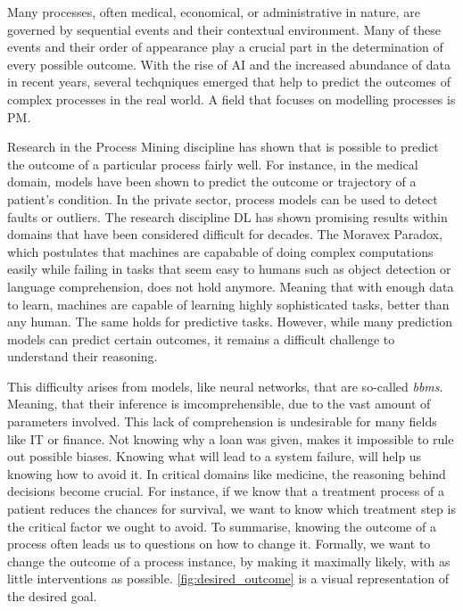 \documentclass[./../../paper.tex]{subfiles}
\begin{document}
Many processes, often medical, economical, or administrative in nature, are governed by sequential events and their contextual environment. Many of these events and their order of appearance play a crucial part in the determination of every possible outcome\autocite{vanderaalst_ProcessMiningManifesto_2012}. With the rise of AI and the increased abundance of data in recent years, several techqniques emerged that help to predict the outcomes of complex processes in the real world. A field that focuses on modelling processes is \gls{PM}.

Research in the Process Mining discipline has shown that is possible to predict the outcome of a particular process fairly well\autocites{tax_PredictiveBusinessProcess_2017a,klimek_Longtermseriesforecasting_2021}. 
For instance, in the medical domain, models have been shown to predict the outcome or trajectory of a patient's condition\autocite{mannhardt_Analyzingtrajectoriespatients_2017}. In the private sector, process models can be used to detect faults or outliers. The research discipline \gls{DL} has shown promising results within domains that have been considered difficult for decades. The Moravex Paradox\autocite{agrawal_studyphenomenonMoravec_2010}, which postulates that machines are capabable of doing complex computations easily while failing in tasks that seem easy to humans such as object detection or language comprehension, does not hold anymore. Meaning that with enough data to learn, machines are capable of learning highly sophisticated tasks, better than any human. The same holds for predictive tasks. However, while many prediction models can predict certain outcomes, it remains a difficult challenge to understand their reasoning. 

This difficulty arises from models, like neural networks, that are so-called \emph{\glspl{bbm}}. Meaning, that their inference is imcomprehensible, due to the vast amount of parameters involved. This lack of comprehension is undesirable for many fields like IT or finance. Not knowing why a loan was given, makes it impossible to rule out possible biases. Knowing what will lead to a system failure, will help us knowing how to avoid it. In critical domains like medicine, the reasoning behind decisions become crucial. For instance, if we know that a treatment process of a patient reduces the chances for survival, we want to know which treatment step is the critical factor we ought to avoid. To summarise, knowing the outcome of a process often leads us to questions on how to change it. Formally, we want to change the outcome of a process instance, by making it maximally likely, with as little interventions as possible\autocite{molnar2019}. \autoref{fig:desired_outcome} is a visual representation of the desired goal.
\end{document}
